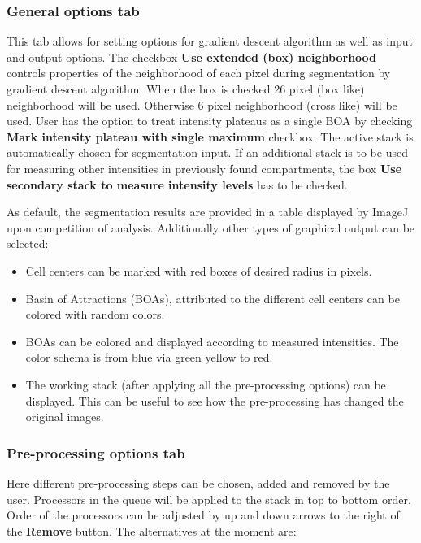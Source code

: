 \documentclass[a4paper,12pt]{article}
\begin{document}
\subsubsection{General options tab}
This tab allows for setting options for gradient descent algorithm as well as input and output options.
The checkbox \textbf{Use extended (box) neighborhood} controls properties of the neighborhood of each pixel during segmentation by gradient descent algorithm. When the box is checked 26 pixel (box like) neighborhood will be used. Otherwise 6 pixel neighborhood (cross like) will be used.
User has the option to treat intensity plateaus as a single BOA by checking \textbf{Mark intensity plateau with single maximum} checkbox.
 The active
stack is automatically chosen for segmentation input. If an additional stack is to
be used for measuring other intensities in previously found compartments, the box \textbf{Use secondary stack to measure intensity levels} has to be checked.

As default, the segmentation results are provided in a table displayed by
ImageJ upon competition of analysis. Additionally other types of graphical output can be selected:

\begin{itemize}
%
\item Cell centers can be marked with red boxes of desired radius in pixels.
%
\item Basin of Attractions (BOAs), attributed to the different cell centers can be
	colored with random colors.
%
\item BOAs can be colored and displayed according to measured intensities. The color schema is from blue via green yellow to red.
%
\item The working stack (after applying all the pre-processing options) can be displayed. This can be useful to see how the
	pre-processing has changed the original images.
%
\end{itemize}

\subsubsection{Pre-processing options tab}
Here different pre-processing steps can be chosen, added and removed by the
user. Processors in the queue will be applied to the stack in top to bottom order. Order of the processors can be adjusted by up and down arrows to the right of the \textbf{Remove} button. The alternatives at the moment are:
\end{document}
